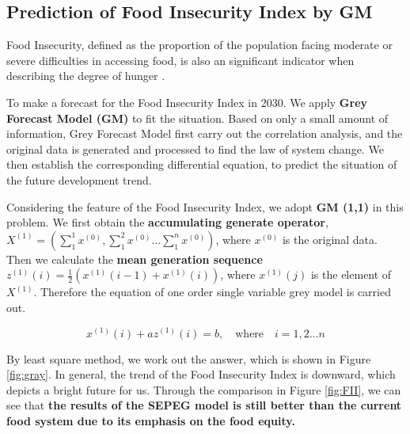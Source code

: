 \documentclass{mcmthesis}
\begin{document}
\subsection{Prediction of Food Insecurity Index by GM}
Food Insecurity, defined as the proportion of the population facing moderate or severe difficulties in accessing food, is also an significant indicator when describing the degree of hunger \cite{fii}.

To make a forecast for the Food Insecurity Index in 2030. We apply \textbf{Grey Forecast Model (GM)} to fit the situation. Based on only a small amount of information, Grey Forecast Model first carry out the correlation analysis, and the original data is generated and processed to find the law of system change. We then establish the corresponding differential equation, to predict the situation of the future development trend.

Considering the feature of the Food Insecurity Index, we adopt \textbf{GM (1,1) }in this problem. We first obtain the \textbf{accumulating generate operator}, $X^{(1)}=(\sum_1^1{x^{(0)}}, \sum_1^2{x^{(0)}} \dots \sum_1^n{x^{(0)}}  )$, where $x^{(0)}$ is the original data. Then we calculate the \textbf{mean generation sequence}  ${z^{(1)}(i)}= \frac{1}{2}({x^{(1)}(i-1)}+{x^{(1)}(i)})$, where ${x^{(1)}(j)}$ is the element of $X^{(1)}$. Therefore the equation of one order single variable grey model is carried out.

\begin{equation}
\label{Eq:GM}
{x^{(1)}(i)}+a{z^{(1)}(i)}=b,\quad \text{where}\quad i=1, 2 \dots n
\end{equation}

By least square method, we work out the answer, which is shown in Figure \ref{fig:gray}. In general, the trend of the Food Insecurity Index is downward, which depicts a bright future for us. Through the comparison in Figure \ref{fig:FII}, we can see that \textbf{the results of the SEPEG model is still better than the current food system due to its emphasis on the food equity.}
\end{document}
